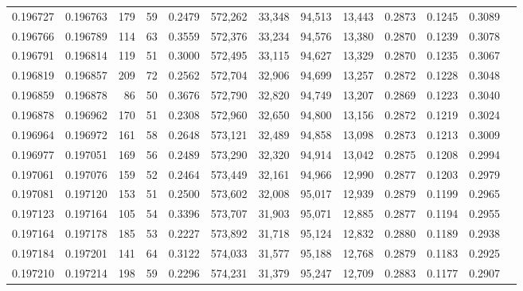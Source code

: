 \begin{tabular}{rrrrrrrrrrrrr}
0.196727 & 0.196763 &   179 &  59 &                                     0.2479 & 572,262 &  33,348 &  94,513 &  13,443 & 0.2873 & 0.1245 & 0.3089 \\
0.196766 & 0.196789 &   114 &  63 &                                     0.3559 & 572,376 &  33,234 &  94,576 &  13,380 & 0.2870 & 0.1239 & 0.3078 \\
0.196791 & 0.196814 &   119 &  51 &                                     0.3000 & 572,495 &  33,115 &  94,627 &  13,329 & 0.2870 & 0.1235 & 0.3067 \\
0.196819 & 0.196857 &   209 &  72 &                                     0.2562 & 572,704 &  32,906 &  94,699 &  13,257 & 0.2872 & 0.1228 & 0.3048 \\
0.196859 & 0.196878 &    86 &  50 &                                     0.3676 & 572,790 &  32,820 &  94,749 &  13,207 & 0.2869 & 0.1223 & 0.3040 \\
0.196878 & 0.196962 &   170 &  51 &                                     0.2308 & 572,960 &  32,650 &  94,800 &  13,156 & 0.2872 & 0.1219 & 0.3024 \\
0.196964 & 0.196972 &   161 &  58 &                                     0.2648 & 573,121 &  32,489 &  94,858 &  13,098 & 0.2873 & 0.1213 & 0.3009 \\
0.196977 & 0.197051 &   169 &  56 &                                     0.2489 & 573,290 &  32,320 &  94,914 &  13,042 & 0.2875 & 0.1208 & 0.2994 \\
0.197061 & 0.197076 &   159 &  52 &                                     0.2464 & 573,449 &  32,161 &  94,966 &  12,990 & 0.2877 & 0.1203 & 0.2979 \\
0.197081 & 0.197120 &   153 &  51 &                                     0.2500 & 573,602 &  32,008 &  95,017 &  12,939 & 0.2879 & 0.1199 & 0.2965 \\
0.197123 & 0.197164 &   105 &  54 &                                     0.3396 & 573,707 &  31,903 &  95,071 &  12,885 & 0.2877 & 0.1194 & 0.2955 \\
0.197164 & 0.197178 &   185 &  53 &                                     0.2227 & 573,892 &  31,718 &  95,124 &  12,832 & 0.2880 & 0.1189 & 0.2938 \\
0.197184 & 0.197201 &   141 &  64 &                                     0.3122 & 574,033 &  31,577 &  95,188 &  12,768 & 0.2879 & 0.1183 & 0.2925 \\
0.197210 & 0.197214 &   198 &  59 &                                     0.2296 & 574,231 &  31,379 &  95,247 &  12,709 & 0.2883 & 0.1177 & 0.2907 \\

\end{tabular}
